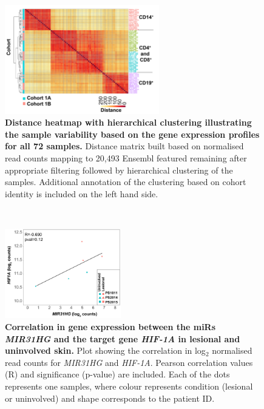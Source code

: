 \begin{figure}[htbp]
	\centering
	\includegraphics[width=0.6\textwidth]{./Results2/pdfs/PS_CTL_all_samples_heatmap_including_batch}
\caption[Distance heatmap with hierarchical clustering illustrating the sample variability based on the gene expression profiles for all 72 samples.]{\textbf{Distance heatmap with hierarchical clustering illustrating the sample variability based on the gene expression profiles for all 72 samples.} Distance matrix built based on normalised read counts mapping to 20,493 Ensembl featured remaining after appropriate filtering followed by hierarchical clustering of the samples. Additional annotation of the clustering based on cohort identity is included on the left hand side.}
\label{figure:RNAseq_heat_map}
\end{figure}
\


\begin{figure}[htbp]
\centering
\includegraphics[width=0.45\textwidth]{./Appendix/pdfs/Chapter4/Skin_RNAseq_correlation_MIR31HG_HIF1A_plot}
\caption[Correlation in gene expression between the miRs \textit{MIR31HG} and the target gene \textit{HIF-1A} in lesional and uninvolved skin.]{\textbf{Correlation in gene expression between the miRs \textit{MIR31HG} and the target gene \textit{HIF-1A} in lesional and uninvolved skin.} Plot showing the correlation in log$_2$ normalised read counts for \textit{MIR31HG} and \textit{HIF-1A}. Pearson correlation values (R) and significance (p-value) are included. Each of the dots represents one samples, where colour represents condition (lesional or uninvolved) and shape corresponds to the patient ID.}
\label{figure:RNAseq_lesional_uninvolved_miR_correlations}
\end{figure}


